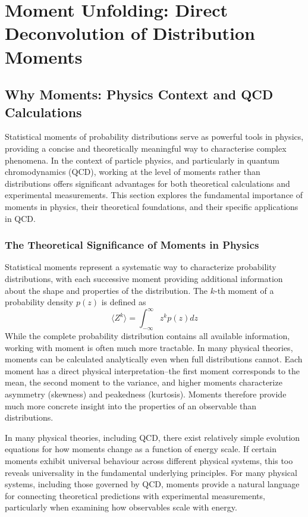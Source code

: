 \chapter{Moment Unfolding: Direct Deconvolution of Distribution Moments}
\label{chap:moment-unfolding}
\section{Why Moments: Physics Context and QCD Calculations}
    Statistical moments of probability distributions serve as powerful tools in physics, providing a concise and theoretically meaningful way to characterise complex phenomena.
    In the context of particle physics, and particularly in quantum chromodynamics (QCD), working at the level of moments rather than distributions offers significant advantages for both theoretical calculations and experimental measurements.
    This section explores the fundamental importance of moments in physics, their theoretical foundations, and their specific applications in QCD.
    \subsection{The Theoretical Significance of Moments in Physics}
        Statistical moments represent a systematic way to characterize probability distributions, with each successive moment providing additional information about the shape and properties of the distribution.
        The $k$-th moment of a probability density $p(z)$ is defined as
        \[
            \langle Z^k \rangle = \int_{-\infty}^{\infty} z^k p(z) dz
        \]
        While the complete probability distribution contains all available information, working with moment is often much more tractable.
        In many physical theories, moments can be calculated analytically even when full distributions cannot.
        Each moment has a direct physical interpretation--the first moment corresponds to the mean, the second moment to the variance, and higher moments characterize asymmetry (skewness) and peakedness (kurtosis).
        Moments therefore provide much more concrete insight into the properties of an observable than distributions.
        
        In many physical theories, including QCD, there exist relatively simple evolution equations for how moments change as a function of energy scale.
        If certain moments exhibit universal behaviour across different physical systems, this too reveals universality in the fundamental underlying principles.
        For many physical systems, including those governed by QCD, moments provide a natural language for connecting theoretical predictions with experimental measurements, particularly when examining how observables scale with energy.
